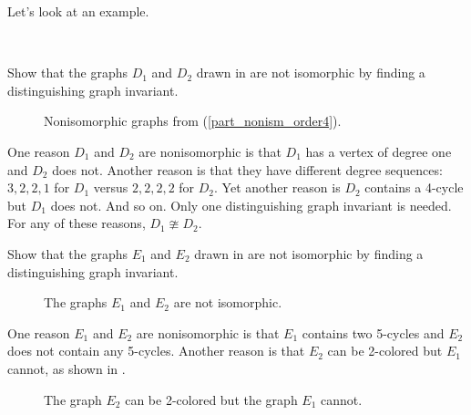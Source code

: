 Let's look at an example.

\begin{exam}
\label{exam_use_graph_invariant_show_nonism}
~
        \begin{apart}
            \item \label{part_nonism_order4} Show that the graphs $D_1$ and $D_2$ drawn in  are not isomorphic by finding a distinguishing graph invariant.
                \begin{figure}[hbtp]
                    \centering
                    
                    \caption{Nonisomorphic graphs from  (\ref{part_nonism_order4}).}
                    \label{fig_notism_C4}
                \end{figure}
                \begin{soln}
                    One reason $D_1$ and $D_2$ are nonisomorphic is that $D_1$ has a vertex of degree one and $D_2$ does not.  Another reason is that they have different degree sequences:  $3,2,2,1$ for $D_1$ versus $2,2,2,2$ for $D_2$.  Yet another reason is $D_2$ contains a 4-cycle but $D_1$ does not.  And so on. Only one distinguishing graph invariant is needed. For any of these reasons, $D_1 \ncong D_2$.
                \end{soln}
            \item Show that the graphs $E_1$ and $E_2$ drawn in  are not isomorphic by finding a distinguishing graph invariant.
                \begin{figure}[hbtp]
                    \centering
                    
                    \caption{The graphs $E_1$ and $E_2$ are not isomorphic.}
                    \label{fig_notism_Ham8}
                \end{figure}
                \begin{soln}              
                    One reason $E_1$ and $E_2$ are nonisomorphic is that $E_1$ contains two 5-cycles and $E_2$ does not contain any 5-cycles.  Another reason is that $E_2$ can be 2-colored but $E_1$ cannot, as shown in . 
                        \begin{figure}[hbtp]
                            \centering
                            
                            \caption{The graph $E_2$ can be 2-colored but the graph $E_1$ cannot.}

\end{figure}
\end{soln}
\end{apart}
\end{exam}
